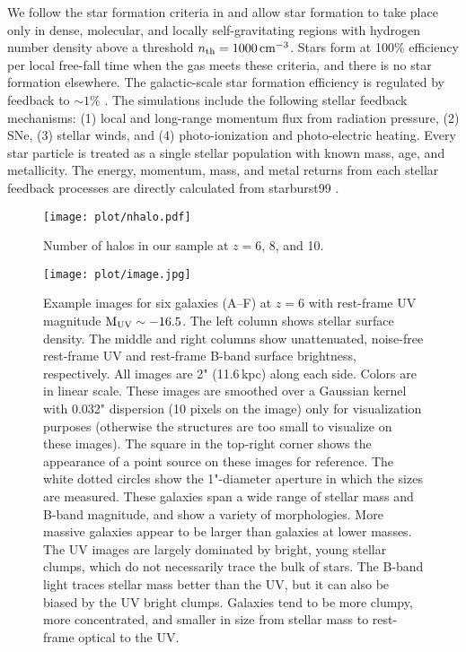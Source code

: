 \documentclass[useAMS,usenatbib]{mn2e}
\newcommand{\muv}{{\rm M_{UV}}}
\newcommand{\cm}{{\rm cm}}
\newcommand{\nc}{n_{\rm th}}
\newcommand{\referee}[1]{{\color{black}#1}}
\begin{document}
We follow the star formation criteria in \citet{hopkins.2013:sf.criteria} and allow star formation to take place only in dense, molecular, and locally self-gravitating regions with hydrogen number density above a threshold $\nc=1000\,\cm^{-3}$. Stars form at 100\% efficiency per local free-fall time when the gas meets these criteria, and there is no star formation elsewhere. The galactic-scale star formation efficiency is regulated by feedback to $\sim1\%$ \citep[e.g.][]{orr.2017:fire.ks.law}. The simulations include the following stellar feedback mechanisms: (1) local and long-range momentum flux from radiation pressure, (2) SNe, (3) stellar winds, and (4) photo-ionization and photo-electric heating. Every star particle is treated as a single stellar population with known mass, age, and metallicity. The energy, momentum, mass, and metal returns from each stellar feedback processes are directly calculated from {\sc starburst99} \citep{leitherer.1999:sb99}.

\begin{figure}
\centering
\texttt{[image: plot/nhalo.pdf]}
\caption{\referee{Number of halos in our sample at $z=6$, 8, and 10.}}
\label{fig:nhalo}
\end{figure}

\begin{figure}
\centering
\texttt{[image: plot/image.jpg]}
\caption{Example images for six galaxies (A--F) at $z=6$ with rest-frame UV magnitude $\muv\sim -16.5$. The left column shows stellar surface density. The middle and right columns show unattenuated, noise-free rest-frame UV and rest-frame B-band surface brightness, respectively. All images are 2" (11.6\,kpc) along each side. Colors are in linear scale. These images are smoothed over a Gaussian kernel with 0.032" dispersion (10 pixels on the image) only for visualization purposes (otherwise the structures are too small to visualize on these images). The square in the top-right corner shows the appearance of a point source on these images for reference. The white dotted circles show the 1"-diameter aperture in which the sizes are measured. These galaxies span a wide range of stellar mass and B-band magnitude, and show a variety of morphologies. More massive galaxies appear to be larger than galaxies at lower masses. The UV images are largely dominated by bright, young stellar clumps, which do not necessarily trace the bulk of stars. The B-band light traces stellar mass better than the UV, but it can also be biased by the UV bright clumps. Galaxies tend to be more clumpy, more concentrated, and smaller in size from stellar mass to rest-frame optical to the UV.}
\label{fig:image}
\end{figure}
\end{document}
